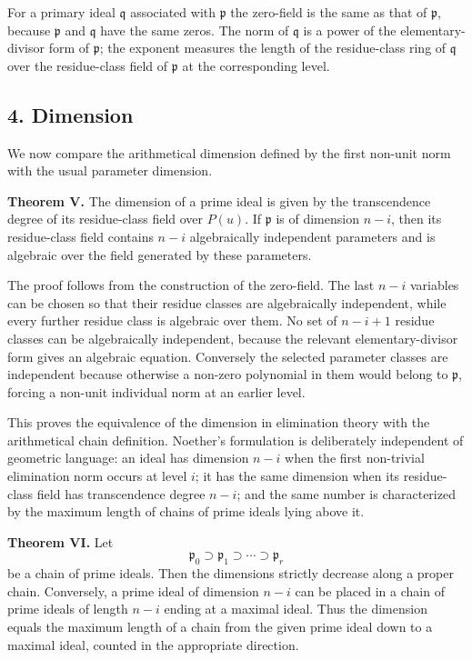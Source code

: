 \documentclass[11pt]{article}
\begin{document}
For a primary ideal $\mathfrak q$ associated with $\mathfrak p$ the zero-field is the same as that of $\mathfrak p$, because $\mathfrak p$ and $\mathfrak q$ have the same zeros. The norm of $\mathfrak q$ is a power of the elementary-divisor form of $\mathfrak p$; the exponent measures the length of the residue-class ring of $\mathfrak q$ over the residue-class field of $\mathfrak p$ at the corresponding level.

\subsection{4. Dimension}

We now compare the arithmetical dimension defined by the first non-unit norm with the usual parameter dimension.

\textbf{Theorem V.} The dimension of a prime ideal is given by the transcendence degree of its residue-class field over $P(u)$. If $\mathfrak p$ is of dimension $n-i$, then its residue-class field contains $n-i$ algebraically independent parameters and is algebraic over the field generated by these parameters.

The proof follows from the construction of the zero-field. The last $n-i$ variables can be chosen so that their residue classes are algebraically independent, while every further residue class is algebraic over them. No set of $n-i+1$ residue classes can be algebraically independent, because the relevant elementary-divisor form gives an algebraic equation. Conversely the selected parameter classes are independent because otherwise a non-zero polynomial in them would belong to $\mathfrak p$, forcing a non-unit individual norm at an earlier level.

This proves the equivalence of the dimension in elimination theory with the arithmetical chain definition. Noether's formulation is deliberately independent of geometric language: an ideal has dimension $n-i$ when the first non-trivial elimination norm occurs at level $i$; it has the same dimension when its residue-class field has transcendence degree $n-i$; and the same number is characterized by the maximum length of chains of prime ideals lying above it.

\textbf{Theorem VI.} Let
\[
  \mathfrak p_0\supset \mathfrak p_1\supset\cdots\supset \mathfrak p_r
\]
be a chain of prime ideals. Then the dimensions strictly decrease along a proper chain. Conversely, a prime ideal of dimension $n-i$ can be placed in a chain of prime ideals of length $n-i$ ending at a maximal ideal. Thus the dimension equals the maximum length of a chain from the given prime ideal down to a maximal ideal, counted in the appropriate direction.
\end{document}
